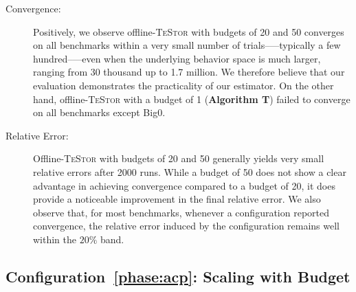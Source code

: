 \documentclass[acmsmall]{acmart}
\newcommand{\testor}{\textsc{TeStor}\xspace}
\begin{document}
\begin{description}
    \item[Convergence:] Positively, we observe offline-\testor with budgets of 20 and 50 converges on all benchmarks within a very small 
    number of trials--—typically a few hundred--—even when the underlying behavior space is much larger, 
    ranging from 30 thousand up to 1.7 million. We therefore believe that our evaluation demonstrates the practicality of our estimator.
    On the other hand, offline-\testor with a budget of 1 (\textbf{Algorithm T}) failed to converge on all benchmarks except Big0.
    \item[Relative Error:] Offline-\testor with budgets of 20 and 50 generally yields very small relative errors after 2000 runs. While a budget of 50 does not show a clear advantage in achieving convergence compared to a budget of 20, it does provide a noticeable improvement in the final relative error. We also observe that, for most benchmarks, whenever a configuration reported convergence, the relative error induced by the configuration remains well within the $20\%$ band.
\end{description}

\subsection{Configuration~\ref{phase:acp}: Scaling with Budget}
\end{document}
